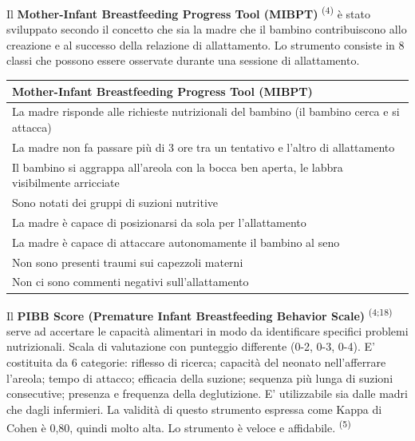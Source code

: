 \documentclass[]{article}
\begin{document}
Il \textbf{Mother-Infant Breastfeeding Progress Tool (MIBPT)}
\textsuperscript{(4)} è stato sviluppato secondo il concetto che sia la
madre che il bambino contribuiscono allo creazione e al successo della
relazione di allattamento. Lo strumento consiste in 8 classi che possono
essere osservate durante una sessione di allattamento.

\begin{longtable}[]{@{}l@{}}
\toprule
\textbf{Mother-Infant Breastfeeding Progress Tool (MIBPT)
}\tabularnewline
\midrule
\endhead
La madre risponde alle richieste nutrizionali del bambino (il bambino
cerca e si attacca)\tabularnewline
La madre non fa passare più di 3 ore tra un tentativo e l'altro di
allattamento\tabularnewline
Il bambino si aggrappa all'areola con la bocca ben aperta, le labbra
visibilmente arricciate\tabularnewline
Sono notati dei gruppi di suzioni nutritive\tabularnewline
La madre è capace di posizionarsi da sola per
l'allattamento\tabularnewline
La madre è capace di attaccare autonomamente il bambino al
seno\tabularnewline
Non sono presenti traumi sui capezzoli materni\tabularnewline
Non ci sono commenti negativi sull'allattamento\tabularnewline
\bottomrule
\end{longtable}

Il \textbf{PIBB Score (Premature Infant Breastfeeding Behavior Scale)}
\textsuperscript{(4;18)} serve ad accertare le capacità alimentari in
modo da identificare specifici problemi nutrizionali. Scala di
valutazione con punteggio differente (0-2, 0-3, 0-4). E' costituita da 6
categorie: riflesso di ricerca; capacità del neonato nell'afferrare
l'areola; tempo di attacco; efficacia della suzione; sequenza più lunga
di suzioni consecutive; presenza e frequenza della deglutizione. E'
utilizzabile sia dalle madri che dagli infermieri. La validità di questo
strumento espressa come Kappa di Cohen è 0,80, quindi molto alta. Lo
strumento è veloce e affidabile. \textsuperscript{(5) }
\end{document}
